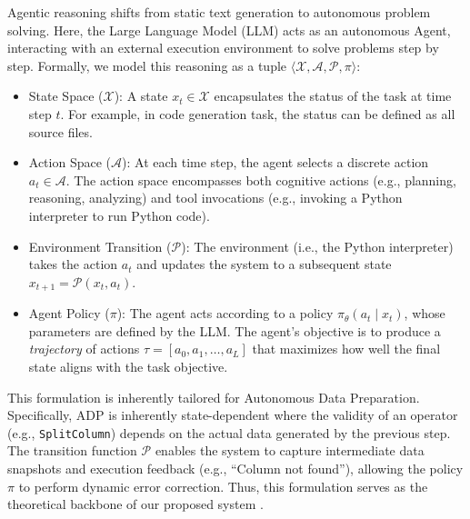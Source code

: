 Agentic reasoning shifts from static text generation to autonomous problem solving. Here, the Large Language Model (LLM) acts as an autonomous {Agent}, interacting with an external execution environment to solve problems step by step. Formally, we model this reasoning as a tuple $\langle \mathcal{X}, \mathcal{A}, \mathcal{P}, \pi \rangle$:

\begin{itemize}[leftmargin=1em]
    \item {State Space ($\mathcal{X}$):} A state $x_t \in \mathcal{X}$ encapsulates the status of the task at time step $t$. For example, in code generation task, the status can be defined as all source files.
    
    \item {Action Space ($\mathcal{A}$):} At each time step, the agent selects a discrete action $a_t \in \mathcal{A}$. The action space encompasses both {cognitive actions} (e.g., planning, reasoning, analyzing) and {tool invocations} (e.g., invoking a Python interpreter to run Python code).
    
    \item {Environment Transition ($\mathcal{P}$):} The environment (i.e., the Python interpreter) takes the action $a_t$ and updates the system to a subsequent state $x_{t+1} = \mathcal{P}(x_t, a_t)$.
    
    \item {Agent Policy ($\pi$):} The agent acts according to a policy $\pi_\theta(a_t \mid x_t)$, whose parameters are defined by the LLM. The agent’s objective is to produce a \textit{trajectory} of actions $\tau = [a_0, a_1, \dots, a_L]$ that maximizes how well the final state aligns with the task objective.
\end{itemize}

 This formulation is inherently tailored for Autonomous Data Preparation.
Specifically, ADP is inherently {state-dependent} where the validity of an operator (e.g., \texttt{SplitColumn}) depends on the actual data generated by the previous step. The transition function $\mathcal{P}$ enables the system to capture intermediate data snapshots and execution feedback (e.g., ``Column not found''), allowing the policy $\pi$ to perform dynamic error correction.
Thus, this formulation serves as the theoretical backbone of our proposed system \sys.

\fi
